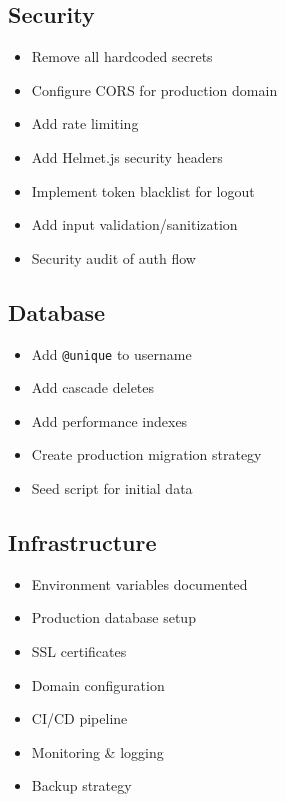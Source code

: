 \documentclass[12pt,a4paper]{article}
\begin{document}
\subsection{Security}

\begin{itemize}[label=$\square$]
    \item Remove all hardcoded secrets
    \item Configure CORS for production domain
    \item Add rate limiting
    \item Add Helmet.js security headers
    \item Implement token blacklist for logout
    \item Add input validation/sanitization
    \item Security audit of auth flow
\end{itemize}

\subsection{Database}

\begin{itemize}[label=$\square$]
    \item Add \texttt{@unique} to username
    \item Add cascade deletes
    \item Add performance indexes
    \item Create production migration strategy
    \item Seed script for initial data
\end{itemize}

\subsection{Infrastructure}

\begin{itemize}[label=$\square$]
    \item Environment variables documented
    \item Production database setup
    \item SSL certificates
    \item Domain configuration
    \item CI/CD pipeline
    \item Monitoring \& logging
    \item Backup strategy
\end{itemize}
\end{document}
